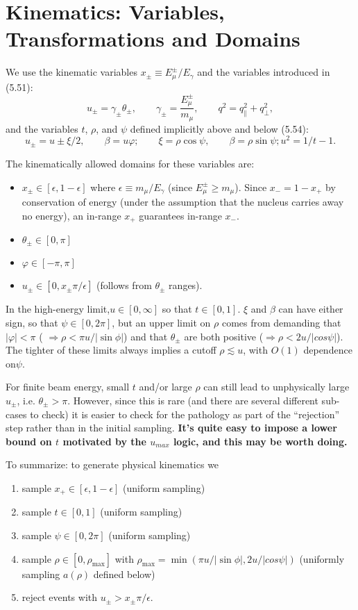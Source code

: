 \documentclass[11pt]{article}
\newcommand{\be}{\begin{equation}}
\newcommand{\ee}{\end{equation}}
\newcommand{\pal}{\parallel}
\begin{document}
\section{Kinematics: Variables, Transformations and Domains}\label{definitions}
We use the kinematic variables $x_\pm \equiv E_\mu^\pm / E_\gamma$ and the variables introduced in (5.51):
\be
u_\pm = \gamma_\pm \theta_\pm, \qquad \gamma_\pm = \frac{E_\mu^\pm}{m_\mu}, \qquad q^2 = q_\pal^2 + q_\perp^2,
\ee
and the variables $t$, $\rho$, and $\psi$ defined implicitly above and below (5.54):
\be
u_\pm = u \pm \xi/2, \qquad \beta = u \varphi; \qquad \xi = \rho \cos\psi, \qquad \beta = \rho \sin\psi; u^2 = 1/t -1.
\ee

The kinematically allowed domains for these variables are:
\begin{itemize}
\item $x_\pm \in [\epsilon, 1-\epsilon]$ where $\epsilon \equiv m_\mu/E_\gamma$ (since $E_\mu^\pm \ge m_\mu$).  Since $x_- = 1 - x_+$ by conservation of energy (under the assumption that the nucleus carries away no energy), an in-range $x_+$ guarantees in-range $x_-$.  
\item $\theta_\pm \in [0,\pi]$
\item $\varphi \in [-\pi,\pi]$
\item $u_\pm \in [0,x_\pm \pi/\epsilon]$ (follows from $\theta_\pm$ ranges).
\end{itemize}

In the high-energy limit,$u \in [0,\infty]$ so that $t \in [0,1]$.   $\xi$ and $\beta$ can have either sign, so that $\psi \in [0,2\pi]$, but an upper limit on $\rho$ comes from demanding that $|\varphi| < \pi$ ( $\Rightarrow \rho < \pi u/|\sin\phi|$) and that $\theta_\pm$ are both positive ($\Rightarrow \rho < 2 u/|cos\psi|$).  The tighter of these limits always implies a cutoff $\rho \lesssim u$, with $O(1)$ dependence on$\psi$.

For finite beam energy, small $t$ and/or large $\rho$  can still lead to unphysically large $u_\pm$, i.e. $\theta_\pm > \pi$.  However, since this is rare (and there are several different sub-cases to check) it is easier to check for the pathology as part of the ``rejection'' step rather than in the initial sampling. \textbf{It's quite easy to impose a lower bound on $t$ motivated by the $u_{max}$ logic, and this may be worth doing.}

To summarize: to generate physical kinematics we
\begin{enumerate}
\item sample $x_+ \in [\epsilon, 1-\epsilon]$ (uniform sampling)
\item sample $t \in [0,1]$ (uniform sampling)
\item sample $\psi \in [0,2\pi]$ (uniform sampling)
\item sample $\rho \in [0,\rho_{\max}]$ with $\rho_{\max} = \min\left( \pi u/|\sin\phi|, 2 u/|cos\psi|\right)$ (uniformly sampling $a(\rho)$ defined below)
\item reject events with $u_\pm > x_\pm \pi/\epsilon$.
\end{enumerate}
\end{document}
